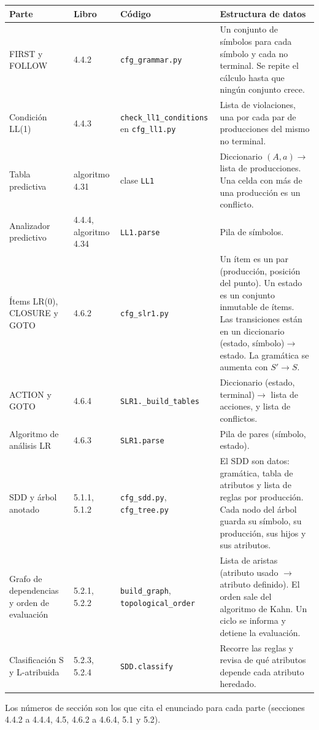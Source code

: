 \documentclass[11pt,a4paper]{article}
\begin{document}
\begin{longtable}{p{3.2cm}p{2.3cm}p{3.1cm}p{6.2cm}}
\toprule
Parte & Libro & Código & Estructura de datos \\
\midrule
\endhead
FIRST y FOLLOW & 4.4.2 & \texttt{cfg\_grammar.py} & Un conjunto de símbolos para cada símbolo y cada no terminal. Se repite el cálculo hasta que ningún conjunto crece. \\
Condición LL(1) & 4.4.3 & \texttt{check\_ll1\_conditions} en \texttt{cfg\_ll1.py} & Lista de violaciones, una por cada par de producciones del mismo no terminal. \\
Tabla predictiva & algoritmo 4.31 & clase \texttt{LL1} & Diccionario $(A,a)\to$ lista de producciones. Una celda con más de una producción es un conflicto. \\
Analizador predictivo & 4.4.4, algoritmo 4.34 & \texttt{LL1.parse} & Pila de símbolos. \\
Ítems LR(0), CLOSURE y GOTO & 4.6.2 & \texttt{cfg\_slr1.py} & Un ítem es un par (producción, posición del punto). Un estado es un conjunto inmutable de ítems. Las transiciones están en un diccionario (estado, símbolo)$\to$estado. La gramática se aumenta con $S'\to S$. \\
ACTION y GOTO & 4.6.4 & \texttt{SLR1.\_build\_tables} & Diccionario (estado, terminal)$\to$ lista de acciones, y lista de conflictos. \\
Algoritmo de análisis LR & 4.6.3 & \texttt{SLR1.parse} & Pila de pares (símbolo, estado). \\
SDD y árbol anotado & 5.1.1, 5.1.2 & \texttt{cfg\_sdd.py}, \texttt{cfg\_tree.py} & El SDD son datos: gramática, tabla de atributos y lista de reglas por producción. Cada nodo del árbol guarda su símbolo, su producción, sus hijos y sus atributos. \\
Grafo de dependencias y orden de evaluación & 5.2.1, 5.2.2 & \texttt{build\_graph}, \texttt{topological\_order} & Lista de aristas (atributo usado $\to$ atributo definido). El orden sale del algoritmo de Kahn. Un ciclo se informa y detiene la evaluación. \\
Clasificación S y L-atribuida & 5.2.3, 5.2.4 & \texttt{SDD.classify} & Recorre las reglas y revisa de qué atributos depende cada atributo heredado. \\
\bottomrule
\end{longtable}

Los números de sección son los que cita el enunciado para cada parte (secciones 4.4.2 a 4.4.4, 4.5, 4.6.2 a 4.6.4, 5.1 y 5.2).
\end{document}

